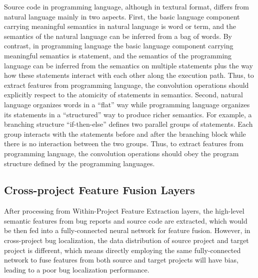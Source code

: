 Source code in programming language, although in textural format, differs from natural language mainly in two aspects. First, the basic language component carrying meaningful semantics in natural language is word or term, and the semantics of the natural language can be inferred from a bag of words. By contrast, in programming language the basic language component carrying meaningful semantics is statement, and the semantics of the programming language can be inferred from the semantics on multiple statements plus the way how these statements interact with each other along the execution path. Thus, to extract features from programming language, the convolution operations should explicitly respect to the atomicity of statements in semantics. Second, natural language organizes words in a ``flat'' way while programming language organizes its statements in a ``structured'' way to produce richer semantics. For example, a branching structure ``if-then-else'' defines two parallel groups of statements. Each group interacts with the statements before and after the branching block while there is no interaction between the two groups. Thus, to extract features from programming language, the convolution operations should obey the program structure defined by the programming languages.

\subsection{Cross-project Feature Fusion Layers}
After processing from Within-Project Feature Extraction layers, the high-level semantic features from bug reports and source code are extracted, which would be then fed into a fully-connected neural network for feature fusion. However, in cross-project bug localization, the data distribution of source project and target project is different, which means directly employing the same fully-connected network to fuse features from both source and target projects will have bias, leading to a poor bug localization performance.

